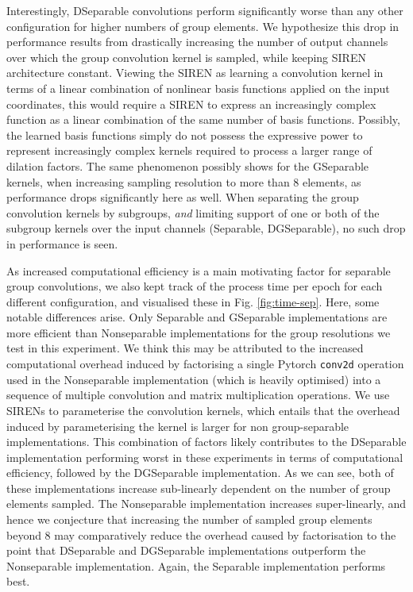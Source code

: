 \documentclass[nohyperref]{article}
\theoremstyle{plain}
\theoremstyle{definition}
\theoremstyle{remark}
\begin{document}
Interestingly, DSeparable convolutions perform significantly worse than any other configuration for higher numbers of group elements. We hypothesize this drop in performance results from drastically increasing the number of output channels over which the group convolution kernel is sampled, while keeping SIREN architecture constant. Viewing the SIREN as learning a convolution kernel in terms of a linear combination of nonlinear basis functions applied on the input coordinates, this would require a SIREN to express an increasingly complex function as a linear combination of the same number of basis functions. Possibly, the learned basis functions simply do not possess the expressive power to represent increasingly complex kernels required to process a larger range of dilation factors. The same phenomenon possibly shows for the GSeparable kernels, when increasing sampling resolution to more than 8 elements, as performance drops significantly here as well. When separating the group convolution kernels by subgroups, \textit{and} limiting support of one or both of the subgroup kernels over the input channels (Separable, DGSeparable), no such drop in performance is seen.

As increased computational efficiency is a main motivating factor for separable group convolutions, we also kept track of the process time per epoch for each different configuration, and visualised these in Fig. \ref{fig:time-sep}. Here, some notable differences arise. Only Separable and GSeparable implementations are more efficient than Nonseparable implementations for the group resolutions we test in this experiment. We think this may be attributed to the increased computational overhead induced by factorising a single Pytorch \texttt{conv2d} operation used in the Nonseparable implementation (which is heavily optimised) into a sequence of multiple convolution and matrix multiplication operations. We use SIRENs to parameterise the convolution kernels, which entails that the overhead induced by parameterising the kernel is larger for non group-separable implementations. This combination of factors likely contributes to the DSeparable implementation performing worst in these experiments in terms of computational efficiency, followed by the DGSeparable implementation. As we can see, both of these implementations increase sub-linearly dependent on the number of group elements sampled. The Nonseparable implementation increases super-linearly, and hence we conjecture that increasing the number of sampled group elements beyond 8 may comparatively reduce the overhead caused by factorisation to the point that DSeparable and DGSeparable implementations outperform the Nonseparable implementation. Again, the Separable implementation performs best.
\end{document}
